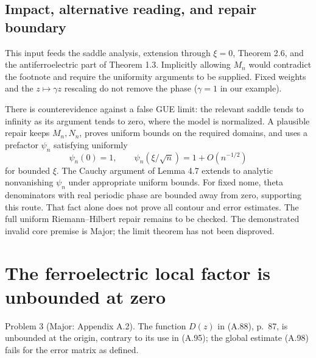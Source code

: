 \documentclass[10pt]{article}
\begin{document}
\subsection*{Impact, alternative reading, and repair boundary}
This input feeds the saddle analysis, extension through \(\xi=0\), Theorem 2.6, and the antiferroelectric part of Theorem 1.3. Implicitly allowing \(M_n\) would contradict the footnote and require the uniformity arguments to be supplied. Fixed weights and the \(z\mapsto\gamma z\) rescaling do not remove the phase (\(\gamma=1\) in our example).\par
There is counterevidence against a false GUE limit: the relevant saddle tends to infinity as its argument tends to zero, where the model is normalized. A plausible repair keeps \(M_n,N_n\), proves uniform bounds on the required domains, and uses a prefactor \(\psi_n\) satisfying uniformly \[\psi_n(0)=1,\qquad\psi_n(\xi/\sqrt n)=1+O(n^{-1/2})\] for bounded \(\xi\). The Cauchy argument of Lemma 4.7 extends to analytic nonvanishing \(\psi_n\) under appropriate uniform bounds. For fixed nome, theta denominators with real periodic phase are bounded away from zero, supporting this route. That fact alone does not prove all contour and error estimates. The full uniform Riemann–Hilbert repair remains to be checked. The demonstrated invalid core premise is Major; the limit theorem has not been disproved.\par
\section*{The ferroelectric local factor is unbounded at zero}
Problem 3 (Major: Appendix A.2).  The function \(D(z)\) in (A.88), p. 87, is unbounded at the origin, contrary to its use in (A.95); the global estimate (A.98) fails for the error matrix as defined.\par
\end{document}
